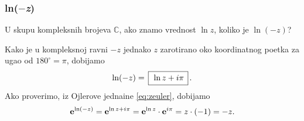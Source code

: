 \subsubsection{ln($-$\textit{z})}

\zadatak U skupu kompleksnih brojeva $\mathbb C$, ako znamo vrednost $\ln z$,
koliko je $\ln(-z)$?

\resenje Kako je u kompleksnoj ravni $-z$ jednako $z$ zarotirano 
oko koordi\-natnog po{\cv}etka
za ugao od $180^\circ=\pi$, dobijamo
$$
\ln (-z) = \ram{\ln z +i\pi}.
$$ 
Ako proverimo, iz Ojlerove jedna{\cv}ine \eqref{eq:zeuler}, dobijamo
$$
{\bf e}^{\ln(-z)} = {\bf e}^{\ln z+i\pi} = {\bf e}^{\ln z}\cdot {\bf e}^{i\pi}=z \cdot (-1)=-z.
$$

